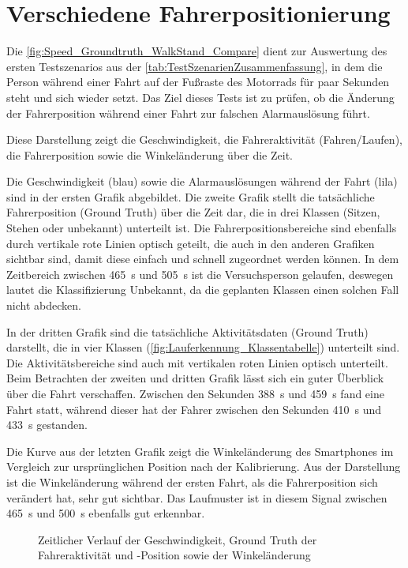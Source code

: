 \section{Verschiedene Fahrerpositionierung}
Die \autoref{fig:Speed_Groundtruth_WalkStand_Compare} dient zur Auswertung des ersten Testszenarios aus der \autoref{tab:TestSzenarienZusammenfassung}, in dem die Person während einer Fahrt auf der Fußraste des Motorrads für paar Sekunden steht und sich wieder setzt. Das Ziel dieses Tests ist zu prüfen, ob die Änderung der Fahrerposition während einer Fahrt zur falschen Alarmauslösung führt.

Diese Darstellung zeigt die Geschwindigkeit, die Fahreraktivität (Fahren/Laufen), die Fahrerposition sowie die Winkeländerung über die Zeit.

Die Geschwindigkeit (blau) sowie die Alarmauslösungen während der Fahrt (lila) sind in der ersten Grafik abgebildet.
Die zweite Grafik stellt die tatsächliche Fahrerposition (Ground Truth) über die Zeit dar, die in drei Klassen (Sitzen, Stehen oder unbekannt) unterteilt ist.
Die Fahrerpositionsbereiche sind ebenfalls durch vertikale rote Linien optisch geteilt, die auch in den anderen Grafiken sichtbar sind, damit diese einfach und schnell zugeordnet werden können.
In dem Zeitbereich zwischen \SI{465}{\second} und \SI{505}{\second} ist die Versuchsperson gelaufen, deswegen lautet die Klassifizierung \glqq Unbekannt\grqq{}, da die geplanten Klassen einen solchen Fall nicht abdecken.

In der dritten Grafik sind die tatsächliche Aktivitätsdaten (Ground Truth) darstellt, die in vier Klassen (\autoref{fig:Lauferkennung_Klassentabelle}) unterteilt sind. Die Aktivitätsbereiche sind auch mit vertikalen roten Linien optisch unterteilt. Beim Betrachten der zweiten und dritten Grafik lässt sich ein guter Überblick über die Fahrt verschaffen. Zwischen den Sekunden \SI{388}{\second} und \SI{459}{\second} fand eine Fahrt statt, während dieser hat der Fahrer zwischen den Sekunden \SI{410}{\second} und \SI{433}{\second} gestanden.

Die Kurve aus der letzten Grafik zeigt die Winkeländerung des Smartphones im Vergleich zur ursprünglichen Position nach der Kalibrierung. Aus der Darstellung ist die Winkeländerung während der ersten Fahrt, als die Fahrerposition sich verändert hat, sehr gut sichtbar. Das Laufmuster ist in diesem Signal zwischen \SI{465}{\second} und \SI{500}{\second} ebenfalls gut erkennbar.
	\begin{figure}[htpb]
		\centering
		\caption{Zeitlicher Verlauf der Geschwindigkeit, Ground Truth der Fahreraktivität und -Position sowie der Winkeländerung}
		\label{fig:Speed_Groundtruth_WalkStand_Compare}
	\end{figure}


